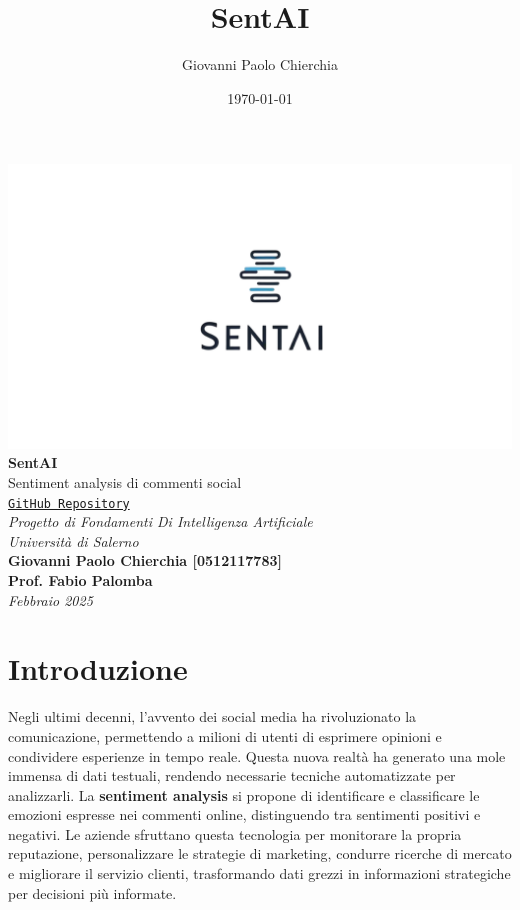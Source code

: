 \documentclass[12pt,a4paper]{report} %
\title{SentAI}
\author{Giovanni Paolo Chierchia}
\date{\today}
\begin{document}
\begin{titlepage}
    \centering
    \includegraphics[width=\textwidth]{immagini/SentAI-Logo.png}\\[1cm] %
    {\Huge \textbf{SentAI}}\\[1cm]
    {\Large Sentiment analysis di commenti social}\\[1cm]
    \href{https://github.com/Giop378/SentAI}{\texttt{GitHub Repository}}\\[1cm]
    \textit{Progetto di Fondamenti Di Intelligenza Artificiale}\\
    \textit{Università di Salerno}\\[2cm]
    \textbf{Giovanni Paolo Chierchia [0512117783]}\\[0.5cm]
    \textbf{Prof. Fabio Palomba}\\[0.5cm]
    \textit{Febbraio 2025}
\end{titlepage}

\tableofcontents %

\chapter{Introduzione}
Negli ultimi decenni, l’avvento dei social media ha rivoluzionato la comunicazione, permettendo a milioni di utenti di esprimere opinioni e condividere esperienze in tempo reale. Questa nuova realtà ha generato una mole immensa di dati testuali, rendendo necessarie tecniche automatizzate per analizzarli.
La \textbf{sentiment analysis }si propone di identificare e classificare le emozioni espresse nei commenti online, distinguendo tra sentimenti positivi e negativi. Le aziende sfruttano questa tecnologia per monitorare la propria reputazione, personalizzare le strategie di marketing, condurre ricerche di mercato e migliorare il servizio clienti, trasformando dati grezzi in informazioni strategiche per decisioni più informate.
\end{document}
